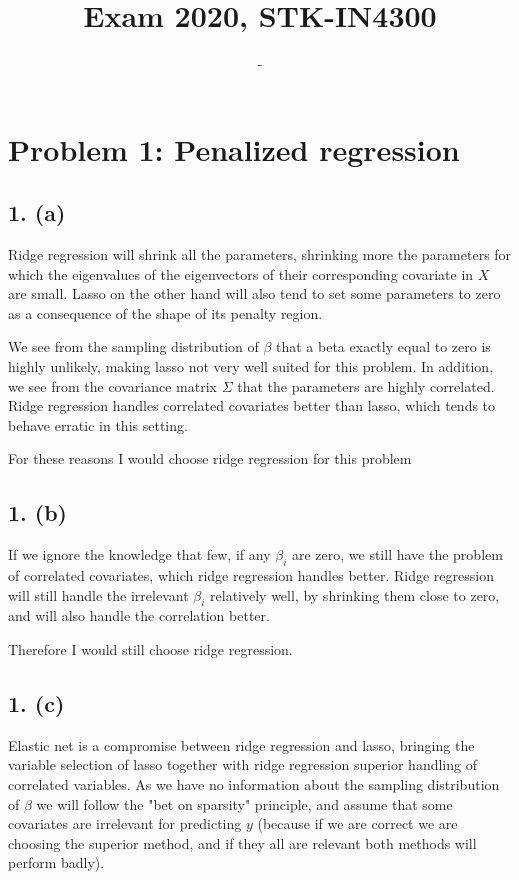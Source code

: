 \documentclass[a4paper, 10pt, english]{article}
\begin{document}
\author{-}
\title{Exam 2020, STK-IN4300}

\maketitle
\tableofcontents

\newpage


\section{Problem 1: Penalized regression}

\subsection{1. (a)}
Ridge regression will shrink all the parameters, shrinking more the parameters for which the eigenvalues of the
eigenvectors of their corresponding covariate in  $X$ are small. Lasso on the other hand will also tend to set
some parameters to zero as a consequence of the shape of its penalty region.

We see from the sampling distribution of $\beta$ that a beta exactly equal to zero is highly unlikely, making
lasso not very well suited for this problem.
In addition, we see from the covariance matrix $\Sigma$ that the parameters are highly correlated.
Ridge regression handles correlated covariates better than lasso, which tends to behave erratic in this
setting.

For these reasons I would choose ridge regression for this problem



\subsection{1. (b)}
If we ignore the knowledge that few, if any $ \beta_i$ are zero, we still have the problem of correlated
covariates, which ridge regression handles better. Ridge regression will still handle the irrelevant $\beta_i$
relatively well, by shrinking them close to zero, and will also handle the correlation better.

Therefore I would still choose ridge regression.

\subsection{1. (c)}
Elastic net is a compromise between ridge regression and lasso, bringing the variable selection of
lasso together with ridge regression superior handling of correlated variables. As we have no information
about the sampling distribution of $ \beta$ we will follow the "bet on sparsity" principle, and assume that
some covariates are irrelevant for predicting $y$ (because if we are correct we are choosing the superior
method, and if they all are relevant both methods will perform badly).
\end{document}

